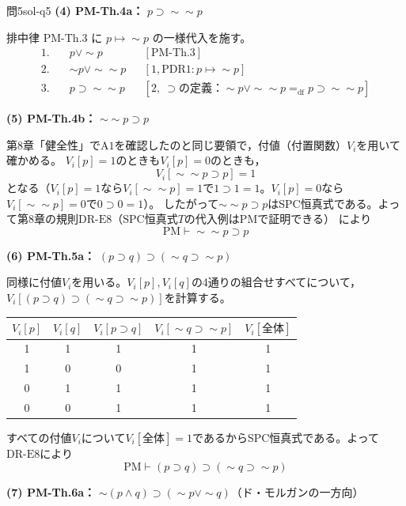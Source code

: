 \documentclass[autodetect-engine,dvi=dvipdfmx,ja=standard]{bxjsarticle}
\begin{document}
\begin{solution}{問5}{sol-q5}
\textbf{(4) PM-Th.4a：} \(p\supset\sim\sim p\)

排中律 \(\mathrm{PM\text{-}Th.3}\) に \(p\mapsto\sim p\) の一様代入を施す。
\begin{align*}
  1.\quad & p\lor\sim p && [\mathrm{PM\text{-}Th.3}]\\
  2.\quad & \sim p\lor\sim\sim p && [1,\mathrm{PDR1}: p\mapsto\sim p]\\
  3.\quad & p\supset\sim\sim p
    && [2,\ \supset\text{の定義：}\sim p\lor\sim\sim p=_{\mathrm{df}}p\supset\sim\sim p]
\end{align*}

\textbf{(5) PM-Th.4b：} \(\sim\sim p\supset p\)

第8章「健全性」で\(\mathrm{A1}\)を確認したのと同じ要領で，付値（付置関数）\(V_i\)を用いて確かめる。
\(V_i[p]=1\)のときも\(V_i[p]=0\)のときも，
\[
  V_i[\sim\sim p\supset p]=1
\]
となる（\(V_i[p]=1\)なら\(V_i[\sim\sim p]=1\)で\(1\supset1=1\)。\(V_i[p]=0\)なら\(V_i[\sim\sim p]=0\)で\(0\supset0=1\)）。
したがって\(\sim\sim p\supset p\)はSPC恒真式である。よって第8章の規則\(\mathrm{DR\text{-}E8}\)（SPC恒真式\(T\)の代入例は\(\mathrm{PM}\)で証明できる）
により
\[
  \mathrm{PM}\vdash\sim\sim p\supset p
\]

\textbf{(6) PM-Th.5a：} \((p\supset q)\supset(\sim q\supset\sim p)\)

同様に付値\(V_i\)を用いる。\(V_i[p],V_i[q]\)の4通りの組合せすべてについて，
\(V_i[(p\supset q)\supset(\sim q\supset\sim p)]\)を計算する。
\begin{center}
\begin{tabular}{cc|c|c|c}
\toprule
\(V_i[p]\) & \(V_i[q]\) & \(V_i[p\supset q]\) & \(V_i[\sim q\supset\sim p]\) & \(V_i[\text{全体}]\) \\
\midrule
1&1&1&1&1\\
1&0&0&1&1\\
0&1&1&1&1\\
0&0&1&1&1\\
\bottomrule
\end{tabular}
\end{center}
すべての付値\(V_i\)について\(V_i[\text{全体}]=1\)であるからSPC恒真式である。よって\(\mathrm{DR\text{-}E8}\)により
\[
  \mathrm{PM}\vdash(p\supset q)\supset(\sim q\supset\sim p)
\]

\textbf{(7) PM-Th.6a：} \(\sim(p\land q)\supset(\sim p\lor\sim q)\)（ド・モルガンの一方向）


\end{solution}
\end{document}
